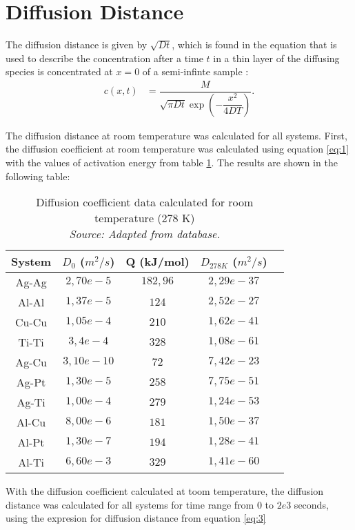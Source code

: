 \clearpage
\section{Diffusion Distance}

The diffusion distance is given by $\sqrt{Dt}$, which is found in the equation that is used to describe the concentration after a time $t$ in a thin layer of the diffusing species is concentrated at $x=0$ of a semi-infinte sample \cite{diff}:
\begin{align}
  \label{eq:3}
  c(x,t)&=\dfrac{M}{\sqrt{\pi D t} \exp\left(-\dfrac{x^2}{4DT}\right)}.
\end{align}

The diffusion distance at room temperature was calculated for all systems. First, the diffusion coefficient at room temperature was calculated using equation \ref{eq:1} with the values of activation energy from table \ref{tab:tabla2}. The results are shown in the following table:

\begin{table}[H]
    \centering
    \begin{tabular}{ccccc}
        System & $D_0$ ($m^2/s$) & Q (kJ/mol) & $D_{278K}$ ($m^2/s$) \\ \hline \hline
        Ag-Ag & $2,70e-5$ & $182,96$ & $2,29e-37$ \\
        Al-Al & $1,37e-5$ & $124$ & $2,52e-27$ \\
        Cu-Cu & $1,05e-4$ & $210$ & $1,62e-41$ \\
        Ti-Ti & $3,4e-4$ & $328$ & $1,08e-61$ \\
        Ag-Cu & $3,10e-10$ & $72$ & $7,42e-23$ \\
        Ag-Pt & $1,30e-5$ & $258$ & $7,75e-51$ \\
        Ag-Ti & $1,00e-4$ & $279$ & $1,24e-53$ \\
        Al-Cu & $8,00e-6$ & $181$ & $1,50e-37$ \\
        Al-Pt & $1,30e-7$ & $194$ & $1,28e-41$ \\
        Al-Ti & $6,60e-3$ & $329$ & $1,41e-60$
    \end{tabular}
    \caption{Diffusion coefficient data calculated for room temperature ($278$ K)\\
    \textit{Source: Adapted from \citep{kakusan} database.}}
    \label{tab:tabla2}
\end{table}

With the diffusion coefficient calculated at toom temperature, the diffusion distance was calculated for all systems for time range from $0$ to $2e3$ seconds, using the expresion for diffusion distance from equation \ref{eq:3}


